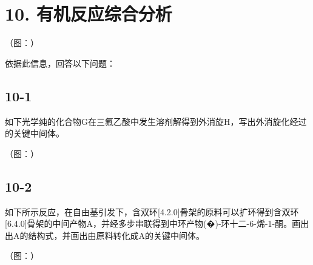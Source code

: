 \section*{10. 有机反应综合分析}
（图：）

依据此信息，回答以下问题：

\subsection*{10-1}
如下光学纯的化合物G在三氟⼄酸中发⽣溶剂解得到外消旋H，写出外消旋化经过的关键中间体。

（图：）

\subsection*{10-2}
如下所⽰反应，在⾃由基引发下，含双环[4.2.0]⻣架的原料可以扩环得到含双环[6.4.0]⻣架的中间产物A，并经多步串联得到中环产物(�)-环⼗⼆-6-烯-1-酮。画出出A的结构式，并画出由原料转化成A的关键中间体。

（图：）

